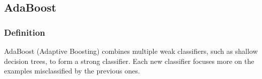 \subsection{AdaBoost}
\subsubsection{Definition}

AdaBoost (Adaptive Boosting) combines multiple weak classifiers, such as shallow decision trees, to form a strong classifier. Each new classifier focuses more on the examples misclassified by the previous ones.

